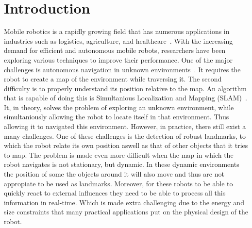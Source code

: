 \chapter{Introduction}\label{chapter:introduction}

Mobile robotics is a rapidly growing field that has numerous applications in industries such as logistics, agriculture, and healthcare~\cite{cognominal2021evolving,kebede2024review,clark2023amazon}. With the increasing demand for efficient and autonomous mobile robots, researchers have been exploring various techniques to improve their performance. One of the major challenges is autonomous navigation in unknown environments~\cite{alatise2020review}. It requires the robot to create a map of the environment while traversing it. The second difficulty is to properly understand its position relative to the map. An algorithm that is capable of doing this is Simultanious Localization and Mapping (SLAM)~\cite{whyte1996slam,whyte2006slam}. It, in theory, solves the problem of exploring an unknown environment, while simultaniously allowing the robot to locate itself in that environment. Thus allowing it to navigated this environment. However, in practice, there still exist a many challenges. One of these challenges is the detection of robust landmarks, to which the robot relate its own position aswell as that of other objects that it tries to map. The problem is made even more difficult when the map in which the robot navigates is not stationary, but dynamic. In these dynamic environments the position of some the objects around it will also move and thus are not appropiate to be used as landmarks. Moreover, for these robots to be able to quickly react to external influences they need to be able to process all this information in real-time. Which is made extra challenging due to the energy and size constraints that many practical applications put on the physical design of the robot.

